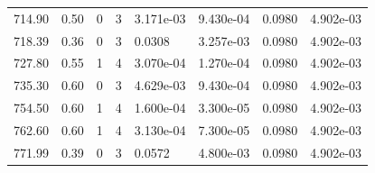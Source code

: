 \documentclass[preview]{standalone}
\begin{document}
{{{\begin{tabular}{L{1.2cm}C{1.2cm} C{0.3cm}C{0.5cm} C{1.4cm}C{1.4cm} C{1.4cm}C{1.4cm}}
  714.90  &  0.50  & 0     &  3 &  3.171e-03  & 9.430e-04  & 0.0980 &  4.902e-03   \\ 
  718.39  &  0.36  & 0     &  3 &  0.0308  & 3.257e-03  & 0.0980 &  4.902e-03   \\ 
  727.80  &  0.55  & 1     &  4 &  3.070e-04  & 1.270e-04  & 0.0980 &  4.902e-03   \\ 
  735.30  &  0.60  & 0     &  3 &  4.629e-03  & 9.430e-04  & 0.0980 &  4.902e-03   \\ 
  754.50  &  0.60  & 1     &  4 &  1.600e-04  & 3.300e-05  & 0.0980 &  4.902e-03   \\ 
  762.60  &  0.60  & 1     &  4 &  3.130e-04  & 7.300e-05  & 0.0980 &  4.902e-03   \\ 
  771.99  &  0.39  & 0     &  3 &  0.0572  & 4.800e-03  & 0.0980 &  4.902e-03   \\ 
\hline 
\end{tabular} 

}}}
\end{document}

